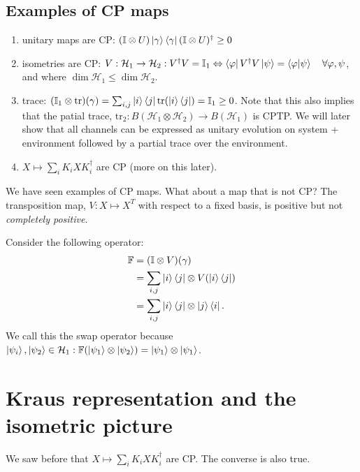 \documentclass[../../note.tex]{subfiles}
\begin{document}
\subsection{Examples of CP maps}
\begin{enumerate}
    \item unitary maps are CP: $(\mathbb{I}\otimes U) \ket{\gamma} \bra{\gamma} (\mathbb{I}\otimes U)^{\dagger} \geq 0$
    \item isometries are CP: $V:\mathcal{H}_1 \rightarrow \mathcal{H}_2: V^{\dagger}V =\mathbb{I}_1 \Leftrightarrow \bra{\varphi} V^{\dagger}V \ket{\psi} = \braket{\varphi|\psi} \quad \forall \varphi,\psi$, and where $\dim\mathcal{H}_1 \leq \dim\mathcal{H}_2$.
    \item trace: $(\mathbb{I}_1 \otimes \text{tr})(\gamma) = \sum_{i,j} \ket{i}\bra{j} \text{tr}(\ket{i}\bra{j}) = \mathbb{I}_1 \geq 0 $. Note that this also implies that the patial trace, $\text{tr}_2: B(\mathcal{H}_1 \otimes \mathcal{H}_2) \rightarrow B(\mathcal{H}_1)$ is CPTP. We will later show that all channels can be expressed as unitary evolution on system + environment followed by a partial trace over the environment. 
    \item $X \mapsto \sum_i K_i X K_i^{\dagger}$ are CP (more on this later).
\end{enumerate}
We have seen examples of CP maps. What about a map that is not CP? The transposition map, $V:X\mapsto X^{T}$ with respect to a fixed basis, is positive but not \textit{completely positive}. 

Consider the following operator:
\begin{align}
    \mathbb{F}&=(\mathbb{I}\otimes V)(\gamma)\\
    &= \sum_{i,j}\ket{i}\bra{j} \otimes V(\ket{i}\bra{j})\\
    &= \sum_{i,j} \ket{i}\bra{j} \otimes \ket{j}\bra{i}.
\end{align}
We call this the swap operator because $\ket{\psi_i},\ket{\psi_2}\in \mathcal{H}_1: \mathbb{F}(\ket{\psi_1}\otimes \ket{\psi_2})=\ket{\psi_1}\otimes \ket{\psi_1}$. 

\section{Kraus representation and the isometric picture}
We saw before that $X\mapsto \sum_i K_i X K_i^{\dagger}$ are CP. The converse is also true. 
\end{document}
